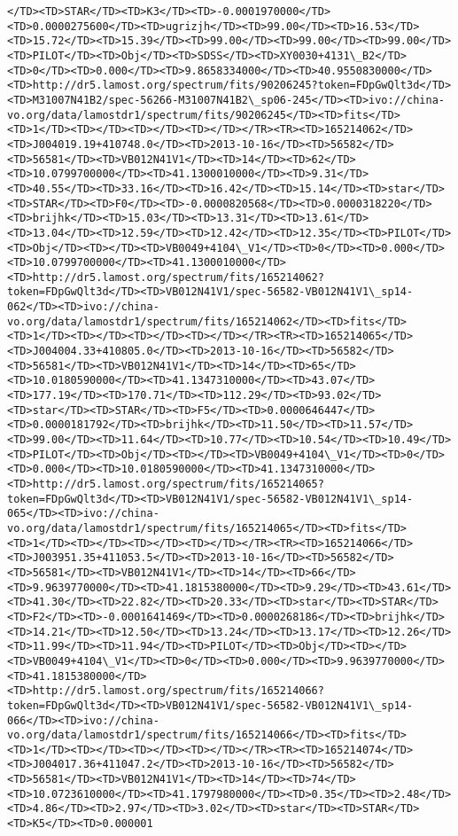 \documentclass[11pt]{article}
\begin{document}
\begin{Verbatim}[commandchars=\\\{\}]
</TD><TD>STAR</TD><TD>K3</TD><TD>-0.0001970000</TD><TD>0.0000275600</TD><TD>ugrizjh</TD><TD>99.00</TD><TD>16.53</TD><TD>15.72</TD><TD>15.39</TD><TD>99.00</TD><TD>99.00</TD><TD>99.00</TD><TD>PILOT</TD><TD>Obj</TD><TD>SDSS</TD><TD>XY0030+4131\_B2</TD><TD>0</TD><TD>0.000</TD><TD>9.8658334000</TD><TD>40.9550830000</TD><TD>http://dr5.lamost.org/spectrum/fits/90206245?token=FDpGwQlt3d</TD><TD>M31007N41B2/spec-56266-M31007N41B2\_sp06-245</TD><TD>ivo://china-vo.org/data/lamostdr1/spectrum/fits/90206245</TD><TD>fits</TD><TD>1</TD><TD></TD><TD></TD><TD></TD></TR><TR><TD>165214062</TD><TD>J004019.19+410748.0</TD><TD>2013-10-16</TD><TD>56582</TD><TD>56581</TD><TD>VB012N41V1</TD><TD>14</TD><TD>62</TD><TD>10.0799700000</TD><TD>41.1300010000</TD><TD>9.31</TD><TD>40.55</TD><TD>33.16</TD><TD>16.42</TD><TD>15.14</TD><TD>star</TD><TD>STAR</TD><TD>F0</TD><TD>-0.0000820568</TD><TD>0.0000318220</TD><TD>brijhk</TD><TD>15.03</TD><TD>13.31</TD><TD>13.61</TD><TD>13.04</TD><TD>12.59</TD><TD>12.42</TD><TD>12.35</TD><TD>PILOT</TD><TD>Obj</TD><TD></TD><TD>VB0049+4104\_V1</TD><TD>0</TD><TD>0.000</TD><TD>10.0799700000</TD><TD>41.1300010000</TD><TD>http://dr5.lamost.org/spectrum/fits/165214062?token=FDpGwQlt3d</TD><TD>VB012N41V1/spec-56582-VB012N41V1\_sp14-062</TD><TD>ivo://china-vo.org/data/lamostdr1/spectrum/fits/165214062</TD><TD>fits</TD><TD>1</TD><TD></TD><TD></TD><TD></TD></TR><TR><TD>165214065</TD><TD>J004004.33+410805.0</TD><TD>2013-10-16</TD><TD>56582</TD><TD>56581</TD><TD>VB012N41V1</TD><TD>14</TD><TD>65</TD><TD>10.0180590000</TD><TD>41.1347310000</TD><TD>43.07</TD><TD>177.19</TD><TD>170.71</TD><TD>112.29</TD><TD>93.02</TD><TD>star</TD><TD>STAR</TD><TD>F5</TD><TD>0.0000646447</TD><TD>0.0000181792</TD><TD>brijhk</TD><TD>11.50</TD><TD>11.57</TD><TD>99.00</TD><TD>11.64</TD><TD>10.77</TD><TD>10.54</TD><TD>10.49</TD><TD>PILOT</TD><TD>Obj</TD><TD></TD><TD>VB0049+4104\_V1</TD><TD>0</TD><TD>0.000</TD><TD>10.0180590000</TD><TD>41.1347310000</TD><TD>http://dr5.lamost.org/spectrum/fits/165214065?token=FDpGwQlt3d</TD><TD>VB012N41V1/spec-56582-VB012N41V1\_sp14-065</TD><TD>ivo://china-vo.org/data/lamostdr1/spectrum/fits/165214065</TD><TD>fits</TD><TD>1</TD><TD></TD><TD></TD><TD></TD></TR><TR><TD>165214066</TD><TD>J003951.35+411053.5</TD><TD>2013-10-16</TD><TD>56582</TD><TD>56581</TD><TD>VB012N41V1</TD><TD>14</TD><TD>66</TD><TD>9.9639770000</TD><TD>41.1815380000</TD><TD>9.29</TD><TD>43.61</TD><TD>41.30</TD><TD>22.82</TD><TD>20.33</TD><TD>star</TD><TD>STAR</TD><TD>F2</TD><TD>-0.0001641469</TD><TD>0.0000268186</TD><TD>brijhk</TD><TD>14.21</TD><TD>12.50</TD><TD>13.24</TD><TD>13.17</TD><TD>12.26</TD><TD>11.99</TD><TD>11.94</TD><TD>PILOT</TD><TD>Obj</TD><TD></TD><TD>VB0049+4104\_V1</TD><TD>0</TD><TD>0.000</TD><TD>9.9639770000</TD><TD>41.1815380000</TD><TD>http://dr5.lamost.org/spectrum/fits/165214066?token=FDpGwQlt3d</TD><TD>VB012N41V1/spec-56582-VB012N41V1\_sp14-066</TD><TD>ivo://china-vo.org/data/lamostdr1/spectrum/fits/165214066</TD><TD>fits</TD><TD>1</TD><TD></TD><TD></TD><TD></TD></TR><TR><TD>165214074</TD><TD>J004017.36+411047.2</TD><TD>2013-10-16</TD><TD>56582</TD><TD>56581</TD><TD>VB012N41V1</TD><TD>14</TD><TD>74</TD><TD>10.0723610000</TD><TD>41.1797980000</TD><TD>0.35</TD><TD>2.48</TD><TD>4.86</TD><TD>2.97</TD><TD>3.02</TD><TD>star</TD><TD>STAR</TD><TD>K5</TD><TD>0.000001
\end{Verbatim}
\end{document}
